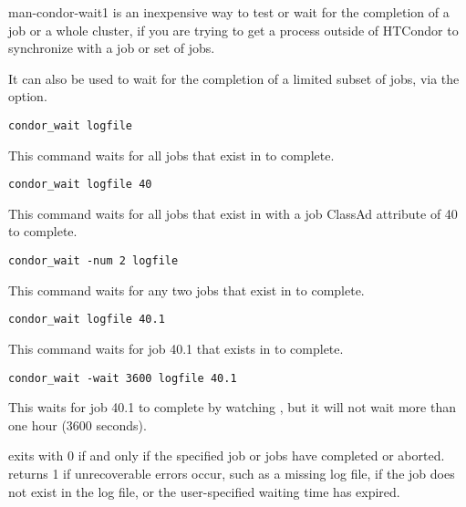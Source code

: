 \begin{ManPage}{}{man-condor-wait}{1}
 is an inexpensive way to test or wait for the completion
of a job or a whole cluster, if you are trying to get a process
outside of HTCondor to synchronize with a job or set of jobs.

It can also be used to wait for the completion of a limited subset of
jobs, via the  option.

\Examples

\begin{verbatim}
condor_wait logfile
\end{verbatim}
This command waits for all jobs that exist in  to complete.

\begin{verbatim}
condor_wait logfile 40
\end{verbatim}
This command waits for all jobs that exist in  
with a job ClassAd attribute  of
40 to complete.

\begin{verbatim}
condor_wait -num 2 logfile
\end{verbatim}
This command waits for any two jobs that exist in  to
complete.

\begin{verbatim}
condor_wait logfile 40.1
\end{verbatim}
This command waits for job 40.1 that exists in  to
complete.

\begin{verbatim}
condor_wait -wait 3600 logfile 40.1
\end{verbatim}
This waits for job 40.1 to
complete by watching , but it will not wait more than one
hour (3600 seconds).

\ExitStatus

 exits with 0 if and only if the specified job or jobs
have completed or
aborted.  returns 1 if unrecoverable errors occur, such
as a missing log file, if the job does not exist in the log file, or
the user-specified waiting time has expired.

\end{ManPage}
